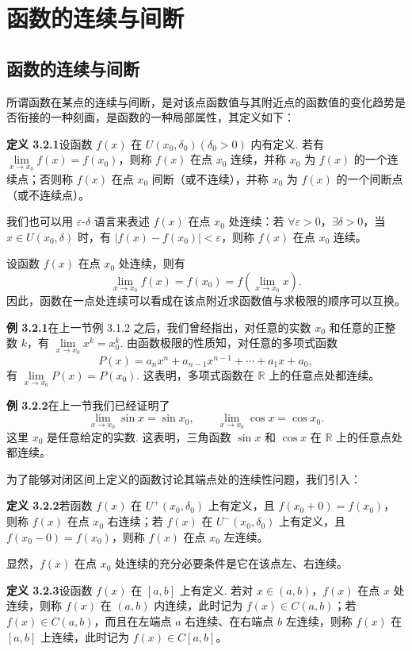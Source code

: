 \documentclass[UTF8,12pt,a4paper,fontset=fandol]{ctexart}
\begin{document}
\section{函数的连续与间断}

\subsection{函数的连续与间断}

所谓函数在某点的连续与间断，是对该点函数值与其附近点的函数值的变化趋势是否衔接的一种刻画，是函数的一种局部属性，其定义如下：

\noindent\textbf{定义 3.2.1}\quad 设函数 $f(x)$ 在 $U(x_0,\delta_0)(\delta_0>0)$ 内有定义. 若有 $\lim\limits_{x\to x_0}f(x)=f(x_0)$，则称 $f(x)$ 在点 $x_0$ 连续，并称 $x_0$ 为 $f(x)$ 的一个连续点；否则称 $f(x)$ 在点 $x_0$ 间断（或不连续），并称 $x_0$ 为 $f(x)$ 的一个间断点（或不连续点）。

我们也可以用 $\varepsilon$-$\delta$ 语言来表述 $f(x)$ 在点 $x_0$ 处连续：若 $\forall\varepsilon>0$，$\exists\delta>0$，当 $x\in U(x_0,\delta)$ 时，有 $|f(x)-f(x_0)|<\varepsilon$，则称 $f(x)$ 在点 $x_0$ 连续。

设函数 $f(x)$ 在点 $x_0$ 处连续，则有
\[
  \lim_{x\to x_0}f(x)=f(x_0)=f\left(\lim_{x\to x_0}x\right).
\]
因此，函数在一点处连续可以看成在该点附近求函数值与求极限的顺序可以互换。

\noindent\textbf{例 3.2.1}\quad 在上一节例 3.1.2 之后，我们曾经指出，对任意的实数 $x_0$ 和任意的正整数 $k$，有 $\lim\limits_{x\to x_0}x^k=x_0^k$. 由函数极限的性质知，对任意的多项式函数
\[
  P(x)=a_nx^n+a_{n-1}x^{n-1}+\cdots+a_1x+a_0,
\]
有 $\lim\limits_{x\to x_0}P(x)=P(x_0)$. 这表明，多项式函数在 $\mathbb{R}$ 上的任意点处都连续。

\noindent\textbf{例 3.2.2}\quad 在上一节我们已经证明了
\[
  \lim_{x\to x_0}\sin x=\sin x_0,\qquad \lim_{x\to x_0}\cos x=\cos x_0.
\]
这里 $x_0$ 是任意给定的实数. 这表明，三角函数 $\sin x$ 和 $\cos x$ 在 $\mathbb{R}$ 上的任意点处都连续。

为了能够对闭区间上定义的函数讨论其端点处的连续性问题，我们引入：

\noindent\textbf{定义 3.2.2}\quad 若函数 $f(x)$ 在 $U^+(x_0,\delta_0)$ 上有定义，且 $f(x_0+0)=f(x_0)$，则称 $f(x)$ 在点 $x_0$ 右连续；若 $f(x)$ 在 $U^-(x_0,\delta_0)$ 上有定义，且 $f(x_0-0)=f(x_0)$，则称 $f(x)$ 在点 $x_0$ 左连续。

显然，$f(x)$ 在点 $x_0$ 处连续的充分必要条件是它在该点左、右连续。

\noindent\textbf{定义 3.2.3}\quad 设函数 $f(x)$ 在 $[a,b]$ 上有定义. 若对 $x\in(a,b)$，$f(x)$ 在点 $x$ 处连续，则称 $f(x)$ 在 $(a,b)$ 内连续，此时记为 $f(x)\in C(a,b)$；若 $f(x)\in C(a,b)$，而且在左端点 $a$ 右连续、在右端点 $b$ 左连续，则称 $f(x)$ 在 $[a,b]$ 上连续，此时记为 $f(x)\in C[a,b]$。
\end{document}
